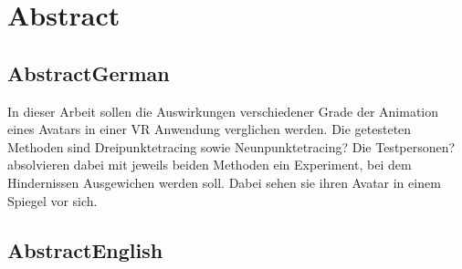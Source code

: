 \chapter*{Abstract}

\section*{AbstractGerman}
In dieser Arbeit sollen die Auswirkungen verschiedener Grade der Animation eines Avatars in einer VR Anwendung verglichen werden. Die getesteten Methoden sind Dreipunktetracing sowie Neunpunktetracing? Die Testpersonen? absolvieren dabei mit jeweils beiden Methoden ein Experiment, bei dem Hindernissen Ausgewichen werden soll. Dabei sehen sie ihren Avatar in einem Spiegel vor sich.


\section*{AbstractEnglish}
